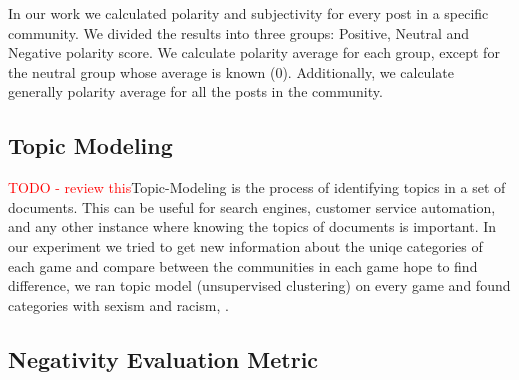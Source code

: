In our work we calculated polarity and subjectivity for every post in a specific community. We divided the results into three groups: Positive, Neutral and Negative polarity score. We calculate polarity average for each group, except for the neutral group whose average is known (0). Additionally, we calculate generally polarity average for all the posts in the community.


\subsection{Topic Modeling}
\textcolor{red}{TODO - review this}Topic-Modeling \cite{wallach2006topic} is the process of identifying topics in a set of documents. This can be useful for search engines, customer service automation, and any other instance where knowing the topics of documents is important. In our experiment we tried to get new information about the uniqe categories of each game and compare between the communities in each game hope to find difference, we ran topic model (unsupervised clustering) on every game and found categories with sexism and racism, .

\subsection{Negativity Evaluation Metric}
 
